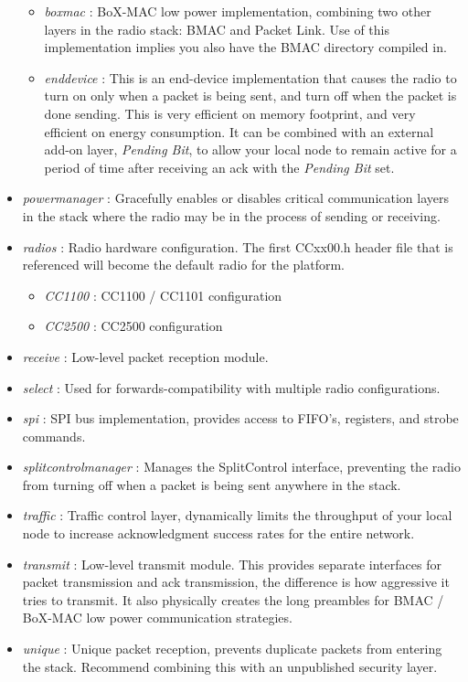 \documentclass{article}
\begin{document}
\begin{itemize}
\begin{itemize}
	    \item \emph{boxmac} : BoX-MAC \cite{boxmac} low power implementation, combining two other
	    layers in the radio stack:  BMAC and Packet Link. Use of this implementation
	    implies you also have the BMAC directory compiled in.
	    \item \emph{enddevice} : This is an end-device implementation that causes
	    the radio to turn on only when a packet is being sent, and turn off when
	    the packet is done sending.  This is very efficient on memory footprint, and 
	    very efficient on energy consumption. It can be combined with an external 
	    add-on layer, \emph{Pending Bit}, to allow your local node to remain active 
	    for a period of time after receiving an ack with the \emph{Pending Bit} set.
	  \end{itemize}
	\item \emph{powermanager} : Gracefully enables or disables critical communication 
	layers in the stack where the radio may be in the process of sending or receiving.
	\item \emph{radios} : Radio hardware configuration. The first CCxx00.h header file
	that is referenced will become the default radio for the platform.
	  \begin{itemize}
	    \item \emph{CC1100} : CC1100 / CC1101 configuration
	    \item \emph{CC2500} : CC2500 configuration
	  \end{itemize}
	\item \emph{receive} : Low-level packet reception module.
	\item \emph{select} : Used for forwards-compatibility with multiple radio 
	configurations.
	\item \emph{spi} : SPI bus implementation, provides access to FIFO's, registers, and 
	strobe commands.
	\item \emph{splitcontrolmanager} : Manages the SplitControl interface, preventing
	the radio from turning off when a packet is being sent anywhere in the stack.
	\item \emph{traffic} : Traffic control layer, dynamically limits the throughput of your local
	node to increase acknowledgment success rates for the entire network.
	\item \emph{transmit} : Low-level transmit module. This provides separate interfaces 
	for packet transmission and ack transmission, the difference is how aggressive it 
	tries to transmit. It also physically creates the long preambles for BMAC / BoX-MAC 
	low power communication strategies.
	\item \emph{unique} : Unique packet reception, prevents duplicate packets from 
	entering the stack. Recommend combining this with an unpublished security layer.
\end{itemize}
\end{document}
